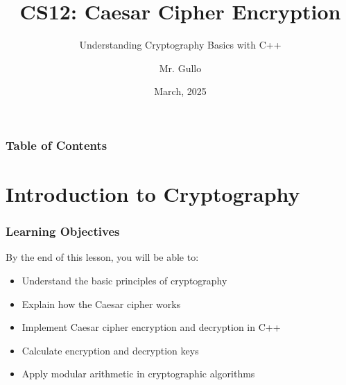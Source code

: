 \documentclass{beamer}
\title[Caesar Cipher]{CS12: Caesar Cipher Encryption}
\subtitle{Understanding Cryptography Basics with C++}
\author[Mr. Gullo]{Mr. Gullo}
\date[March 2025]{March, 2025}
\institute{Computer Science Department}
\begin{document}
\begin{frame}
    \titlepage
\end{frame}

\begin{frame}
    \frametitle{Table of Contents}
    \tableofcontents
\end{frame}

\section{Introduction to Cryptography}

\begin{frame}
    \frametitle{Learning Objectives}
    By the end of this lesson, you will be able to:
    \begin{itemize}
        \item Understand the basic principles of cryptography
        \item Explain how the Caesar cipher works
        \item Implement Caesar cipher encryption and decryption in C++
        \item Calculate encryption and decryption keys
        \item Apply modular arithmetic in cryptographic algorithms
    \end{itemize}
\end{frame}
\end{document}
